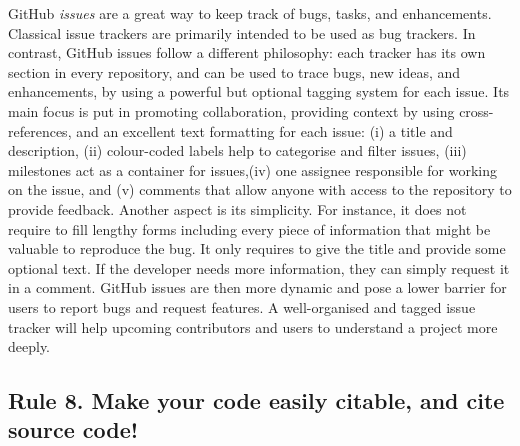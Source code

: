 \documentclass[10pt,letterpaper]{article}
\begin{document}
GitHub \emph{issues} are a great way to keep track of bugs, tasks, and
enhancements. Classical issue trackers are primarily intended to be used
as bug trackers. In contrast, GitHub issues follow a different
philosophy: each tracker has its own section in every repository, and
can be used to trace bugs, new ideas, and enhancements, by using a
powerful but optional tagging system for each issue. Its main focus is
put in promoting collaboration, providing context by using
cross-references, and an excellent text formatting for each issue: (i) a
title and description, (ii) colour-coded labels help to categorise and
filter issues, (iii) milestones act as a container for issues,(iv) one
assignee responsible for working on the issue, and (v) comments that
allow anyone with access to the repository to provide feedback. Another
aspect is its simplicity. For instance, it does not require to fill
lengthy forms including every piece of information that might be
valuable to reproduce the bug. It only requires to give the title and
provide some optional text. If the developer needs more information,
they can simply request it in a comment. GitHub issues are then more
dynamic and pose a lower barrier for users to report bugs and request
features. A well-organised and tagged issue tracker will help upcoming
contributors and users to understand a project more deeply.

\subsection*{Rule 8. Make your code easily citable, and cite source
code!}\label{rule-8.-make-your-code-easily-citable-and-cite-source-code}
\end{document}
